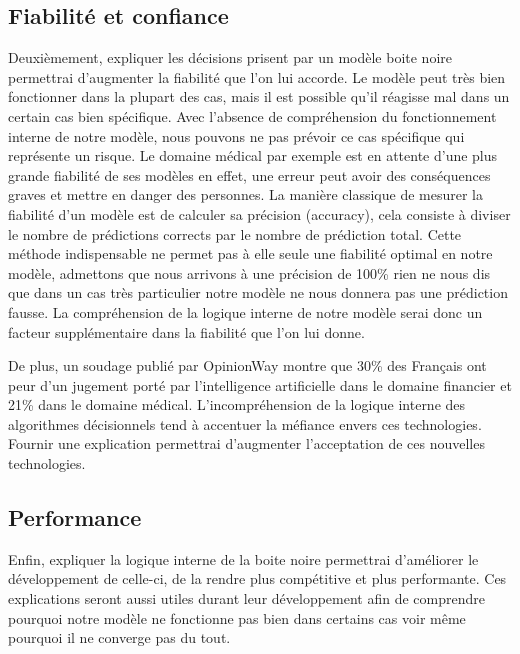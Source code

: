 \subsection{Fiabilité et confiance}
Deuxièmement, expliquer les décisions prisent par un modèle boite noire permettrai d'augmenter la fiabilité que l'on lui accorde. Le modèle peut très bien fonctionner dans la plupart des cas, mais il est possible qu'il réagisse mal dans un certain cas bien spécifique. Avec l'absence de compréhension du fonctionnement interne de notre modèle, nous pouvons ne pas prévoir ce cas spécifique qui représente un risque. Le domaine médical par exemple est en attente d'une plus grande fiabilité de ses modèles en effet, une erreur peut avoir des conséquences graves et mettre en danger des personnes. La manière classique de mesurer la fiabilité d'un modèle est de calculer sa précision (accuracy), cela consiste à diviser le nombre de prédictions corrects par le nombre de prédiction total. Cette méthode indispensable ne permet pas à elle seule une fiabilité optimal en notre modèle, admettons que nous arrivons à une précision de 100\% rien ne nous dis que dans un cas très particulier notre modèle ne nous donnera pas une prédiction fausse. La compréhension de la logique interne de notre modèle serai donc un facteur supplémentaire dans la fiabilité que l'on lui donne. \par
De plus, un soudage publié par OpinionWay\cite{opinionWay} montre que 30\% des Français ont peur d'un jugement porté par l'intelligence artificielle dans le domaine financier et 21\% dans le domaine médical. L'incompréhension de la logique interne des algorithmes décisionnels tend à accentuer la méfiance envers ces technologies. Fournir une explication permettrai d'augmenter l'acceptation de ces nouvelles technologies.

\subsection{Performance}
Enfin, expliquer la logique interne de la boite noire permettrai d'améliorer le développement de celle-ci, de la rendre plus compétitive et plus performante. Ces explications seront aussi utiles durant leur développement afin de comprendre pourquoi notre modèle ne fonctionne pas bien dans certains cas voir même pourquoi il ne converge pas du tout.

